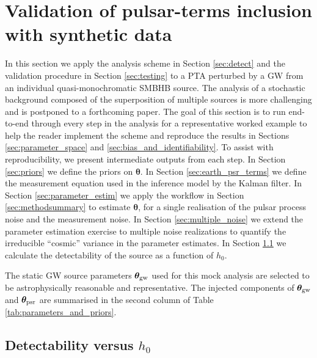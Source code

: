 \documentclass[fleqn,usenatbib,useAMS]{mnras}
\begin{document}
\section{Validation of pulsar-terms inclusion with synthetic data} \label{sec:rep_example}
In this section we apply the analysis scheme in Section \ref{sec:detect} and the validation procedure in Section \ref{sec:testing} to a PTA perturbed by a GW from an individual quasi-monochromatic SMBHB source. The analysis of a stochastic background composed of the superposition of multiple sources is more challenging and is postponed to a forthcoming paper. The goal of this section is to run end-to-end through every step in the analysis for a representative worked example to help the reader implement the scheme and reproduce the results in Sections \ref{sec:parameter_space} and \ref{sec:bias_and_identifiability}. To assist with reproducibility, we present intermediate outputs from each step. In Section \ref{sec:priors} we define the priors on $\boldsymbol{\theta}$. In Section \ref{sec:earth_psr_terms} we define the measurement equation used in the inference model by the Kalman filter. In Section \ref{sec:parameter_estim} we apply the workflow in Section \ref{sec:methodsummary} to estimate $\boldsymbol{\theta}$, for a single realisation of the pulsar process noise and the measurement noise. In Section \ref{sec:multiple_noise} we extend the parameter estimation exercise to multiple noise realizations to quantify the irreducible ``cosmic'' variance in the parameter estimates. In Section \ref{sec:detection} we calculate the detectability of the source as a function of $h_0$. \newline


The static GW source parameters $\boldsymbol{\theta}_{\rm gw}$ used for this mock analysis are selected to be astrophysically reasonable and representative. The injected components of $\boldsymbol{\theta}_{\rm gw}$ and $\boldsymbol{\theta}_{\rm psr}$ are summarised in the second column of Table \ref{tab:parameters_and_priors}.





\subsection{Detectability versus $h_0$} \label{sec:detection}
\end{document}
